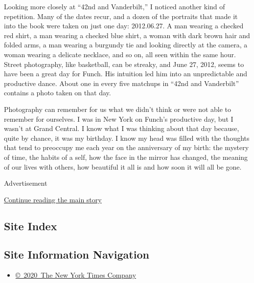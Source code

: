 Looking more closely at ``42nd and Vanderbilt,'' I noticed another kind
of repetition. Many of the dates recur, and a dozen of the portraits
that made it into the book were taken on just one day: 2012.06.27. A man
wearing a checked red shirt, a man wearing a checked blue shirt, a woman
with dark brown hair and folded arms, a man wearing a burgundy tie and
looking directly at the camera, a woman wearing a delicate necklace, and
so on, all seen within the same hour. Street photography, like
basketball, can be streaky, and June 27, 2012, seems to have been a
great day for Funch. His intuition led him into an unpredictable and
productive dance. About one in every five matchups in ``42nd and
Vanderbilt'' contains a photo taken on that day.

Photography can remember for us what we didn't think or were not able to
remember for ourselves. I was in New York on Funch's productive day, but
I wasn't at Grand Central. I know what I was thinking about that day
because, quite by chance, it was my birthday. I know my head was filled
with the thoughts that tend to preoccupy me each year on the anniversary
of my birth: the mystery of time, the habits of a self, how the face in
the mirror has changed, the meaning of our lives with others, how
beautiful it all is and how soon it will all be gone.

Advertisement

\protect\hyperlink{after-bottom}{Continue reading the main story}

\hypertarget{site-index}{%
\subsection{Site Index}\label{site-index}}

\hypertarget{site-information-navigation}{%
\subsection{Site Information
Navigation}\label{site-information-navigation}}

\begin{itemize}
\tightlist
\item
  \href{https://help.nytimes3xbfgragh.onion/hc/en-us/articles/115014792127-Copyright-notice}{©~2020~The
  New York Times Company}
\end{itemize}

